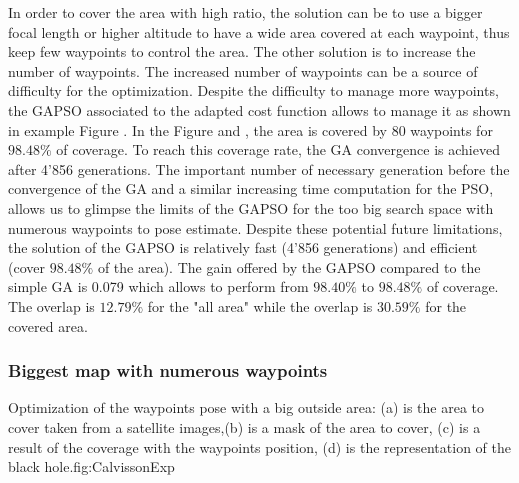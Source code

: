 In order to cover the area with high ratio, the solution can be to use a bigger focal length or higher altitude to have a wide area covered at each waypoint, thus keep few waypoints to control the area. The other solution is to increase the number of waypoints. The increased number of waypoints can be a source of difficulty for the optimization. Despite the difficulty to manage more waypoints,  the GAPSO associated to the adapted cost function allows to manage it as shown in example Figure . 
 In the Figure  and , the area is covered by 80 waypoints for $98.48\%$ of coverage. To reach this coverage rate, the GA convergence is achieved after 4'856 generations. The important number of necessary generation before the convergence of the GA and a similar  increasing time computation for the PSO, allows us to glimpse the limits of the GAPSO for the too big search space with numerous waypoints to pose estimate. Despite these potential future limitations, the solution of the GAPSO is relatively fast (4'856 generations) and efficient (cover $98.48\%$ of the area). The gain offered by the GAPSO  compared to  the simple GA is  0.079 which allows to perform from $98.40\%$ to $98.48\%$ of coverage.  The overlap is $12.79\%$ for the "all area" while the overlap is  $30.59\%$ for the covered area. 
 

		\subsubsection{Biggest map with numerous waypoints}\label{sec:biggestMapcalWaypoint}
\begin{mfigures}[!]{Optimization of the waypoints pose with a big outside area: (a) is the area to cover taken from a satellite images,(b) is a mask of the area to cover, (c) is a result of the coverage with the waypoints position, (d) is the representation of the black hole.}{fig:CalvissonExp} \centering
{}
\hspace{1cm}
\hspace{1cm}
\tabsimuposeCalvisson
\end{mfigures}	

